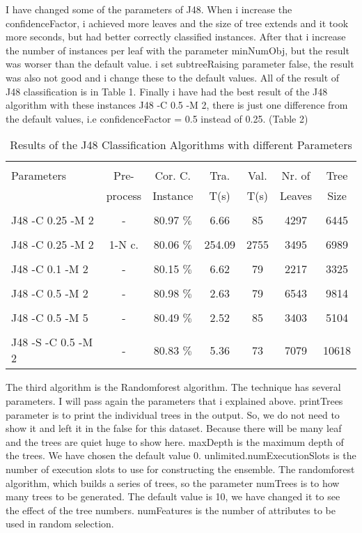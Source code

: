 \documentclass[a4paper]{article}
\begin{document}
I have changed some of the parameters of J48. When i increase the confidenceFactor, i achieved more leaves and the size of tree extends and it took more seconds, but had better correctly classified instances. After that i increase the number of instances per leaf with the parameter minNumObj, but the result was worser than the default value. i set subtreeRaising parameter false, the result was also not good and i change these to the default values. All of the result of J48 classification is in Table 1. Finally i have had the best result of the J48 algorithm with these instances J48 -C 0.5 -M 2, there is just one difference from the default values, i.e confidenceFactor = 0.5 instead of 0.25. (Table 2) 

\begin{table}
\begin{tabular}{|l| c | c | c | c |c |c |}

\hline & & & & & & \\
Parameters & Pre- & Cor. C.& Tra. & Val. & Nr. of  &  Tree  \\
 & process  & Instance & T(s) &  T(s) & Leaves & Size \\
\hline & & & & & & \\
J48 -C 0.25 -M 2 	 & - &			80.97  $\%$ & 6.66 & 85 & 4297  & 6445 \\ 
\hline & & & & & & \\
J48 -C 0.25 -M 2 	& 1-N c. &	80.06 $\%$ & 254.09 & 2755 & 3495  & 6989  \\ 
\hline & & & & & & \\
J48 -C 0.1 -M 2 	 & - &			80.15  $\%$ & 6.62 & 79 &  2217 & 3325\\ 
\hline & & & & & & \\
J48 -C 0.5 -M 2 	& - &			80.98 $\%$ & 2.63 & 79 &  6543 & 9814 \\ 
\hline & & & & & & \\
J48 -C 0.5 -M 5  	 & - &			80.49 $\%$ & 2.52 & 85 &  3403 & 5104 \\ 
\hline & & & & & & \\
J48 -S -C 0.5 -M 2 	& -&			 80.83 $\%$ & 5.36 &  73 & 7079 & 10618\\ 
\hline
\end{tabular}
\caption{Results of the J48 Classification Algorithms with different Parameters}
\end{table}

The third algorithm is the Randomforest algorithm. The technique has several parameters. I will pass again the parameters that i explained above. printTrees parameter is to print the individual trees in the output. So, we do not need to show it and left it in the false for this dataset. Because there will be many leaf and the trees are quiet huge to show here. maxDepth is the maximum depth of the trees. We have chosen the default value 0. unlimited.numExecutionSlots is the number of execution slots to use for constructing the ensemble. The randomforest algorithm, which builds a series of trees, so the parameter numTrees is to how many trees to be generated. The default value is 10, we have changed it to see the effect of the tree numbers. numFeatures is the number of attributes to be used in random selection. 
\end{document}
